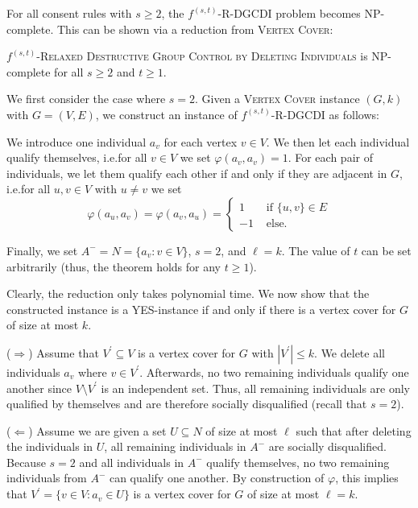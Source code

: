 \documentclass[
    12pt,               %
    a4paper,            %
    bibtotoc,           %
    pointlessnumbers,   %
    ngerman,            %
    titlepage,          %
    leqno,              %
    ]{scrarticle}       %
\begin{document}
For all consent rules with $s \geq 2$, the $f^{(s, t)}$-R-DGCDI problem becomes NP-complete. This can be shown via a reduction from \textsc{Vertex Cover}:



\begin{Theorem} \label{thm:fst_rdgcdi_npc}
$f^{(s, t)}$-\textsc{Relaxed Destructive Group Control by Deleting Individuals} is NP-complete for all $s \geq 2$ and $t \geq 1$.
\end{Theorem}

\begin{Proof}
We first consider the case where $s=2$. Given a \textsc{Vertex Cover} instance $(G, k)$ with $G = (V, E)$, we construct an instance of $f^{(s, t)}$-R-DGCDI as follows:

We introduce one individual $a_v$ for each vertex $v \in V$. We then let each individual qualify themselves, i.e.\@ for all $v \in V$ we set $\varphi(a_v, a_v) = 1$. For each pair of individuals, we let them qualify each other if and only if they are adjacent in $G$, i.e.\@ for all $u, v \in V$ with $u \neq v$ we set
$$
\varphi(a_u, a_v) = \varphi(a_v, a_u) = \left\{\begin{array}{cl}
1 & \text { if }\{u, v\} \in E \\
-1 & \text { else. }
\end{array}\right.
$$

Finally, we set $A^- = N = \{ a_v : v \in V \}$, $s=2$, and $\ell = k$. The value of $t$ can be set arbitrarily (thus, the theorem holds for any $t \geq 1$).

Clearly, the reduction only takes polynomial time. We now show that the constructed instance is a YES-instance if and only if there is a vertex cover for $G$ of size at most $k$.

($\Rightarrow$) Assume that $V^\prime \subseteq V$ is a vertex cover for $G$ with $|V^\prime| \leq k$. We delete all individuals $a_v$ where $v \in V^\prime$. Afterwards, no two remaining individuals qualify one another since $V \setminus V^\prime$ is an independent set. Thus, all remaining individuals are only qualified by themselves and are therefore socially disqualified (recall that $s=2$).

($\Leftarrow$) Assume we are given a set $U \subseteq N$ of size at most $\ell$ such that after deleting the individuals in $U$, all remaining individuals in $A^-$ are socially disqualified. Because $s=2$ and all individuals in $A^-$ qualify themselves, no two remaining individuals from $A^-$ can qualify one another. By construction of $\varphi$, this implies that $V^\prime = \{ v \in V : a_v \in U \}$ is a vertex cover for $G$ of size at most $\ell = k$.


\end{Proof}
\end{document}
